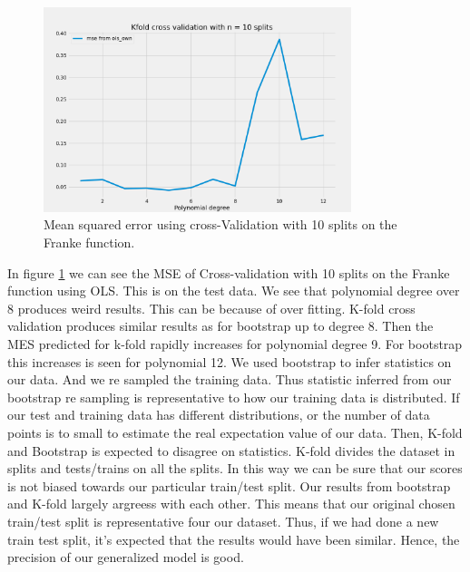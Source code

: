


\begin{figure}[H]
    \centering
    \includegraphics[width=0.8\textwidth]{Figures/d_kfold_ols_n_10.png}
    \caption{Mean squared error using cross-Validation with 10 splits on the Franke function.}
    \label{fig:kfold_ols_franke}
\end{figure}

In figure \ref{fig:kfold_ols_franke} we can see the MSE of Cross-validation
with 10 splits on the Franke function using OLS. This is on the test data. We
see that polynomial degree over 8 produces weird results. This can be because
of over fitting. 
K-fold cross validation produces similar results as for bootstrap up to degree
8. Then the MES predicted for k-fold rapidly increases for polynomial degree 9.
For bootstrap this increases is seen for polynomial 12. We used bootstrap to
infer statistics on our data. And we re sampled the training data. Thus
statistic inferred from our bootstrap re sampling is representative to how our
training data is distributed. If our test and training data has different
distributions, or the number of data points is to small to estimate the real
expectation value of our data. Then, K-fold and Bootstrap is expected to
disagree on statistics. K-fold divides the dataset in splits and tests/trains
on all the splits. In this way we can be sure that our scores is not biased
towards our particular train/test split. Our results from bootstrap and K-fold
largely argreess with each other. This means that our original chosen
train/test split is representative four our dataset. Thus, if we had done a new
train test split, it's expected that the results would have been similar.
Hence, the precision of our generalized model is good. 

